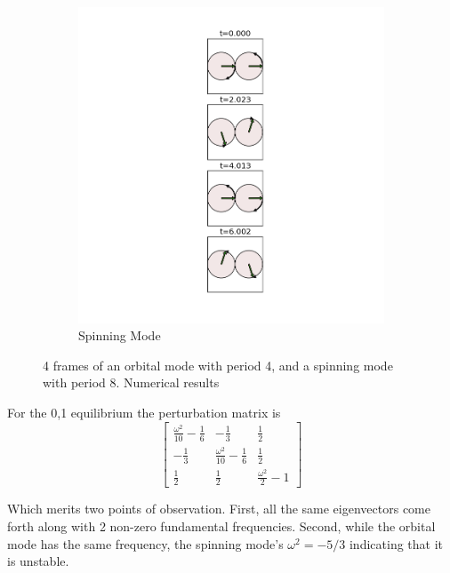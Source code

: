 \documentclass[prb,preprint]{revtex4-1}
\begin{document}
\begin{figure}[h]
	\begin{subfigure}{.3\textwidth}
	  \centering
	  \includegraphics[height=0.6\textheight]{./images/spinning_animatic.png}
	  \caption{Spinning Mode}
	  \label{fig:sfig1}
	\end{subfigure}%


  \caption{4 frames of an orbital mode with period 4, and a spinning mode with period 8. Numerical results}
\end{figure}

For the 0,1 equilibrium the perturbation matrix is 
\begin{equation}
	\left[\begin{matrix}\frac{\omega^{2}}{10} - \frac{1}{6} & - \frac{1}{3} & \frac{1}{2}\\
	- \frac{1}{3} & \frac{\omega^{2}}{10} - \frac{1}{6} & \frac{1}{2}\\
	\frac{1}{2} & \frac{1}{2} & \frac{\omega^{2}}{2} - 1\end{matrix}\right]\end{equation}

Which merits two points of observation. First, all the same eigenvectors come forth along with 2 non-zero fundamental frequencies. Second, while the orbital mode has the same frequency, the spinning mode's $\omega^2=-5/3$ indicating that it is unstable.
\end{document}
